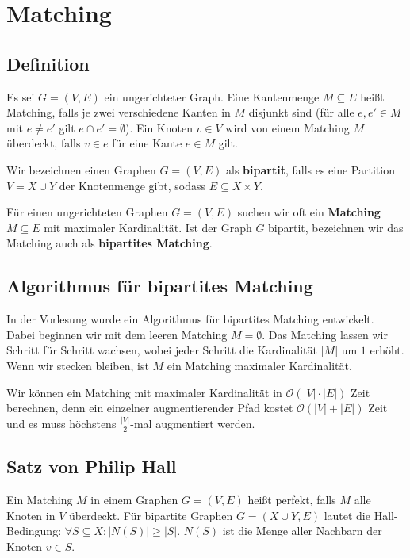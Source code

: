 \documentclass[12pt]{article}
\begin{document}
\section{Matching}

\subsection{Definition}

Es sei $G = (V, E)$ ein ungerichteter Graph. Eine Kantenmenge $M \subseteq E$ heißt Matching, falls je zwei verschiedene Kanten in $M$ disjunkt sind (für alle $e, e' \in M$ mit $e \neq e'$ gilt $e \cap e' = \emptyset$). Ein Knoten $v \in V$ wird von einem Matching $M$ überdeckt, falls $v \in e$ für eine Kante $e \in M$ gilt.

Wir bezeichnen einen Graphen $G = (V, E)$ als \textbf{bipartit}, falls es eine Partition $V = X \cup Y$ der Knotenmenge gibt, sodass $E \subseteq X \times Y$.

Für einen ungerichteten Graphen $G = (V, E)$ suchen wir oft ein \textbf{Matching} $M \subseteq E$ mit maximaler Kardinalität. Ist der Graph $G$ bipartit, bezeichnen wir das Matching auch als \textbf{bipartites Matching}.

\subsection{Algorithmus für bipartites Matching}

In der Vorlesung wurde ein Algorithmus für bipartites Matching entwickelt. Dabei beginnen wir mit dem leeren Matching $M = \emptyset$. Das Matching lassen wir Schritt für Schritt wachsen, wobei jeder Schritt die Kardinalität $|M|$ um $1$ erhöht. Wenn wir stecken bleiben, ist $M$ ein Matching maximaler Kardinalität.

Wir können ein Matching mit maximaler Kardinalität in $\mathcal O(|V|\cdot|E|)$ Zeit berechnen, denn ein einzelner augmentierender Pfad kostet $\mathcal O(|V|+|E|)$ Zeit und es muss höchstens $\frac{|V|}{2}$-mal augmentiert werden.

\subsection{Satz von Philip Hall}

Ein Matching $M$ in einem Graphen $G = (V, E)$ heißt perfekt, falls $M$ alle Knoten in $V$ überdeckt. Für bipartite Graphen $G = (X \cup Y, E)$ lautet die Hall-Bedingung: $\forall S \subseteq X : |N(S)| \geq |S|$. $N(S)$ ist die Menge aller Nachbarn der Knoten $v \in S$.
\end{document}

